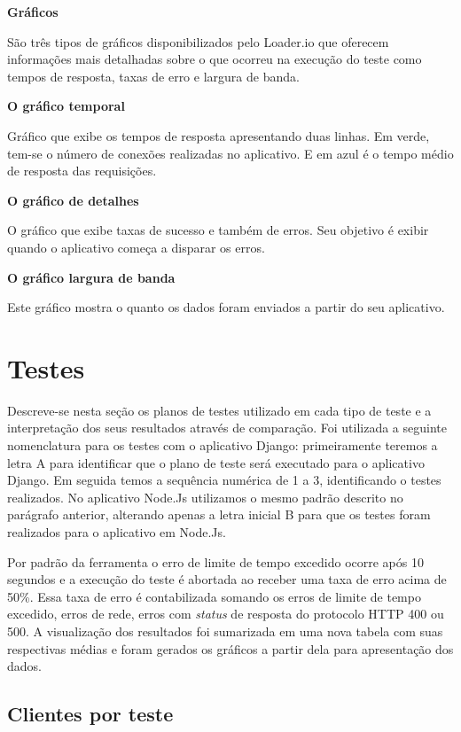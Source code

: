   \textbf{Gráficos}

  São três tipos de gráficos disponibilizados pelo Loader.io que oferecem informações mais detalhadas
  sobre o que ocorreu na execução do teste como tempos de resposta, taxas de erro e largura de banda.

  \textbf{O gráfico temporal}

  Gráfico que exibe os tempos de resposta apresentando duas linhas. Em verde, tem-se o
  número de conexões realizadas no aplicativo. E em azul é o tempo médio de resposta das requisições.

  \textbf{O gráfico de detalhes}

  O gráfico que exibe taxas de sucesso e também de erros. Seu objetivo é exibir quando o aplicativo
  começa a disparar os erros.

  \textbf{O gráfico largura de banda}

  Este gráfico mostra o quanto os dados foram enviados a partir do seu aplicativo.


\section{Testes}

  Descreve-se nesta seção os planos de testes utilizado em cada tipo de teste e a interpretação dos seus resultados
  através de comparação.
  Foi utilizada a seguinte nomenclatura para os testes com o aplicativo Django: primeiramente teremos a letra A para identificar
  que o plano de teste será executado para o aplicativo Django. Em seguida temos a sequência numérica de 1 a 3,
  identificando o testes realizados.
  No aplicativo Node.Js utilizamos o mesmo padrão descrito no parágrafo anterior, alterando apenas a letra inicial B para que os testes
  foram realizados para o aplicativo em Node.Js.

  Por padrão da ferramenta o erro de limite de tempo excedido ocorre após 10 segundos e a execução do teste é abortada
  ao receber uma taxa de erro acima de 50\%. Essa taxa de erro é contabilizada somando os erros de limite de tempo excedido, erros de
  rede, erros com \textit{status} de resposta do protocolo \ac{HTTP} 400 ou 500.
  A visualização dos resultados foi sumarizada em uma nova tabela com suas respectivas médias e foram gerados os gráficos a partir dela para apresentação dos
  dados.

\subsection{Clientes por teste}

